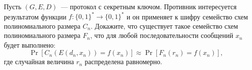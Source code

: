 Пусть $(G, E, D)$~--- протокол с секретным ключом. Противник интересуется результатом функции $f\colon
\{0, 1\}^* \to \{0, 1\}^*$ и он применяет к шифру семейство схем полиномиального размера $C_n$. Докажите,
что существует такое семейство схем полиномиального размера $F_n$, что для любой последовательности
сообщений $x_n$ будет выполнено:
$$
    \Pr[C_n(E(d_n, x_n)) = f(x_n)] \approx \Pr[F_n(r_n) = f(x_n)],
$$
где случайная величина $r_n$ распределена равномерно.